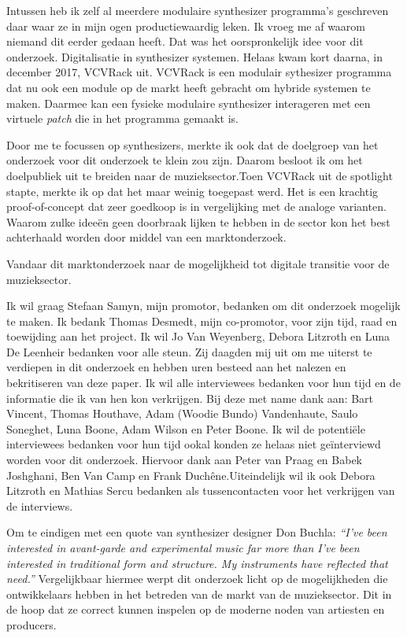 Intussen heb ik zelf al meerdere modulaire synthesizer programma's geschreven daar waar ze in mijn ogen productiewaardig leken. Ik vroeg me af waarom niemand dit eerder gedaan heeft. Dat was het oorspronkelijk idee voor dit onderzoek. Digitalisatie in synthesizer systemen. Helaas kwam kort daarna, in december 2017, VCVRack uit. VCVRack is een modulair sythesizer programma dat nu ook een module op de markt heeft gebracht om hybride systemen te maken. Daarmee kan een fysieke modulaire synthesizer interageren met een virtuele \textit{patch} die in het programma gemaakt is.

Door me te focussen op synthesizers, merkte ik ook dat de doelgroep van het onderzoek voor dit onderzoek te klein zou zijn. Daarom besloot ik om het doelpubliek uit te breiden naar de muzieksector.\newline Toen VCVRack uit de spotlight stapte, merkte ik op dat het maar weinig toegepast werd. Het is een krachtig proof-of-concept dat zeer goedkoop is in vergelijking met de analoge varianten. Waarom zulke ideeën geen doorbraak lijken te hebben in de sector kon het best achterhaald worden door middel van een marktonderzoek.

Vandaar dit marktonderzoek naar de mogelijkheid tot digitale transitie voor de muzieksector.

Ik wil graag Stefaan Samyn, mijn promotor, bedanken om dit onderzoek mogelijk te maken. Ik bedank Thomas Desmedt, mijn co-promotor, voor zijn tijd, raad en toewijding aan het project.\newline 
Ik wil Jo Van Weyenberg, Debora Litzroth en Luna De Leenheir bedanken voor alle steun. Zij daagden mij uit om me uiterst te verdiepen in dit onderzoek en hebben uren besteed aan het nalezen en bekritiseren van deze paper.\newline
Ik wil alle interviewees bedanken voor hun tijd en de informatie die ik van hen kon verkrijgen. Bij deze met name dank aan: Bart Vincent, Thomas Houthave, Adam (Woodie Bundo) Vandenhaute, Saulo Soneghet, Luna Boone, Adam Wilson en Peter Boone. Ik wil de potentiële interviewees bedanken voor hun tijd ookal konden ze helaas niet geïnterviewd worden voor dit onderzoek. Hiervoor dank aan Peter van Praag en Babek Joshghani, Ben Van Camp en Frank Duchêne.\newline Uiteindelijk wil ik ook Debora Litzroth en Mathias Sercu bedanken als tussencontacten voor het verkrijgen van de interviews.

Om te eindigen met een quote van synthesizer designer Don Buchla: \textit{``I've been interested in avant-garde and experimental music far more than I've been interested in traditional form and structure. My instruments have reflected that need.''} Vergelijkbaar hiermee werpt dit onderzoek licht op de mogelijkheden die ontwikkelaars hebben in het betreden van de markt van de muzieksector. Dit in de hoop dat ze correct kunnen inspelen op de moderne noden van artiesten en producers.



